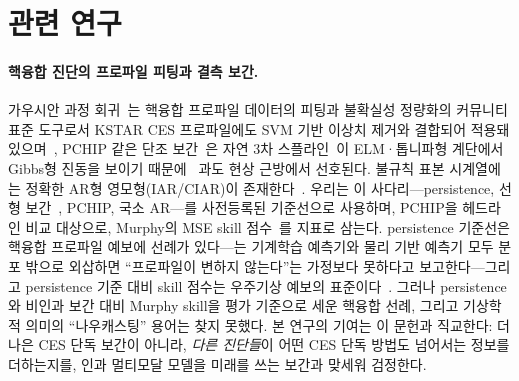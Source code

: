 \documentclass[10pt,a4paper]{article}
\begin{document}
\section{관련 연구}
\label{sec:related}

\paragraph{핵융합 진단의 프로파일 피팅과 결측 보간.}
가우시안 과정 회귀~\citep{rasmussen2006}는 핵융합 프로파일 데이터의 피팅과
불확실성 정량화의 커뮤니티 표준 도구로서 KSTAR CES \Ti{} 프로파일에도 SVM 기반
이상치 제거와 결합되어 적용돼
있으며~\citep{chilenski2015,michoski2024,Kim2024KineticProfile},
PCHIP 같은 단조 보간~\citep{fritsch1980,dougherty1989}은 자연 3차
스플라인~\citep{reinsch1967}이 ELM·톱니파형 계단에서 Gibbs형 진동을
보이기 때문에~\citep{kvernadze1998} 과도 현상 근방에서 선호된다. 불규칙 표본
시계열에는 정확한 AR형 영모형(IAR/CIAR)이
존재한다~\citep{eyheramendy2018,elorrieta2019}. 우리는 이
사다리---persistence, 선형 보간~\citep{press2007}, PCHIP, 국소 AR---를
사전등록된 기준선으로 사용하며, PCHIP을 헤드라인 비교 대상으로, Murphy의 MSE
skill 점수~\citep{murphy1988}를 지표로 삼는다. persistence 기준선은 핵융합 프로파일
예보에 선례가 있다---\citet{Abbate2025Combining}는 기계학습 예측기와 물리 기반 예측기
모두 분포 밖으로 외삽하면 ``프로파일이 변하지 않는다''는 가정보다 못하다고
보고한다---그리고 persistence 기준 대비 skill 점수는 우주기상 예보의
표준이다~\citep{Owens2013Persistence}. 그러나 persistence와 비인과 보간 대비 Murphy
skill을 평가 기준으로 세운 핵융합 선례, 그리고 기상학적 의미의 ``나우캐스팅'' 용어는
찾지 못했다. 본 연구의 기여는 이 문헌과
직교한다: 더 나은 CES 단독 보간이 아니라, \emph{다른 진단들}이 어떤 CES 단독
방법도 넘어서는 정보를 더하는지를, 인과 멀티모달 모델을 미래를 쓰는 보간과
맞세워 검정한다.
\end{document}
